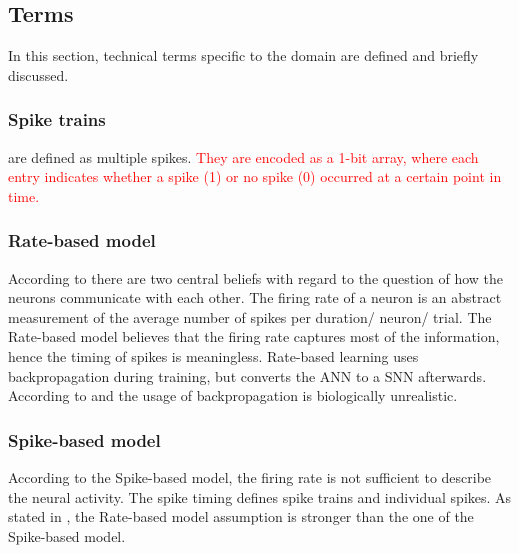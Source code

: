 \newcommand\rbModel{Rate-based model}
\newcommand\sbModel{Spike-based model}
\subsection{Terms}
\label{subsec:terms}

In this section, technical terms specific to the domain are defined and briefly discussed.

\subsubsection{Spike trains}
are defined as multiple spikes.
\textcolor{red}{
They are encoded as a 1-bit array, where each entry indicates whether a spike (1) or no spike (0) occurred at a certain point in time.
}

\subsubsection{\rbModel{}}
According to \cite{spike_vs_rate} there are two central beliefs with regard to the question of how the neurons communicate with each other.
The firing rate of a neuron is an abstract measurement of the average number of spikes per duration/ neuron/ trial.
The \rbModel{} believes that the firing rate captures most of the information, hence the timing of spikes is meaningless.
Rate-based learning uses backpropagation during training, but converts the \ac{ANN} to a \ac{SNN} afterwards. 
According to \cite{SNN} and \cite{STDP_like} the usage of backpropagation is biologically unrealistic.

\subsubsection{\sbModel{}}
According to the \sbModel{}, the firing rate is not sufficient to describe the neural activity.
The spike timing defines spike trains and individual spikes.
As stated in \cite{spike_vs_rate}, the \rbModel{} assumption is stronger than the one of the \sbModel{}.
